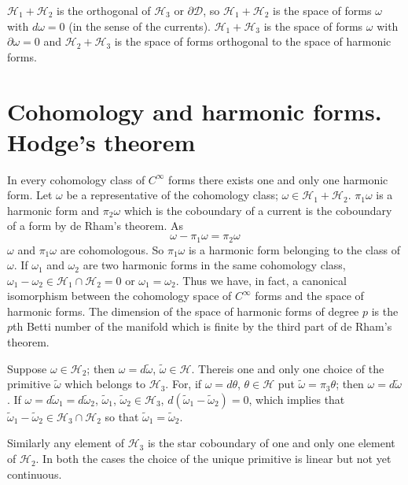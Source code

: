 $\mathscr{H}_{1}+\mathscr{H}_{2}$ is the orthogonal of
$\mathscr{H}_{3}$ or $\partial\mathscr{D}$, so
$\mathscr{H}_{1}+\mathscr{H}_{2}$ is the space of forms $\omega$ with
$d\omega=0$ (in the sense of the
currents). $\mathscr{H}_{1}+\mathscr{H}_{3}$ is the space of forms
$\omega$ with $\partial\omega=0$ and $\mathscr{H}_{2}+\mathscr{H}_{3}$
is the space of forms orthogonal to the space of harmonic forms.

\section*{Cohomology and harmonic forms. Hodge's theorem}

In every cohomology class of $C^{\infty}$ forms there exists one and
only one harmonic form. Let $\omega$ be a representative of the
cohomology class;
$\omega\in\mathscr{H}_{1}+\mathscr{H}_{2}$. $\pi_{1}\omega$ is a
harmonic form and $\pi_{2}\omega$ which is the coboundary of a current
is the coboundary of a form by de Rham's theorem. As
$$
\omega-\pi_{1}\omega=\pi_{2}\omega
$$
$\omega$ and $\pi_{1}\omega$ are cohomologous. So $\pi_{1}\omega$ is a
harmonic form belonging to the class of $\omega$. If $\omega_{1}$ and
$\omega_{2}$ are two harmonic forms in the same cohomology class,
$\omega_{1}-\omega_{2}\in\mathscr{H}_{1}\cap \mathscr{H}_{2}=0$ or
$\omega_{1}=\omega_{2}$. Thus we have, in fact, a canonical
isomorphism between the cohomology space of $C^{\infty}$ forms and the
space of harmonic forms. The dimension of the space of harmonic forms
of degree $p$ is the $p$th Betti number of the manifold which is
finite by the third part of de Rham's theorem.

Suppose $\omega\in\mathscr{H}_{2}$; then $\omega=d\widetilde{\omega}$,
$\widetilde{\omega}\in\mathscr{H}$. 
There\pageoriginale is one and only one choice of the primitive
$\widetilde{\omega}$ which belongs to $\mathscr{H}_{3}$. For, if
$\omega=d\theta$, $\theta\in\mathscr{H}$ put
$\widetilde{\omega}=\pi_{3}\theta$; then
$\omega=d\widetilde{\omega}$. If
$\omega=d\widetilde{\omega}_{1}=d\widetilde{\omega}_{2}$,
$\widetilde{\omega}_{1}$, $\widetilde{\omega}_{2}\in \mathscr{H}_{3}$,
$d(\widetilde{\omega}_{1}-\widetilde{\omega}_{2})=0$, which implies
that
$\widetilde{\omega}_{1}-\widetilde{\omega}_{2}\in\mathscr{H}_{3}\cap
\mathscr{H}_{2}$ so that
$\widetilde{\omega}_{1}=\widetilde{\omega}_{2}$. 

Similarly any element of $\mathscr{H}_{3}$ is the star coboundary of
one and only one element of $\mathscr{H}_{2}$. In both the cases the
choice of the unique primitive is linear but not yet continuous.

